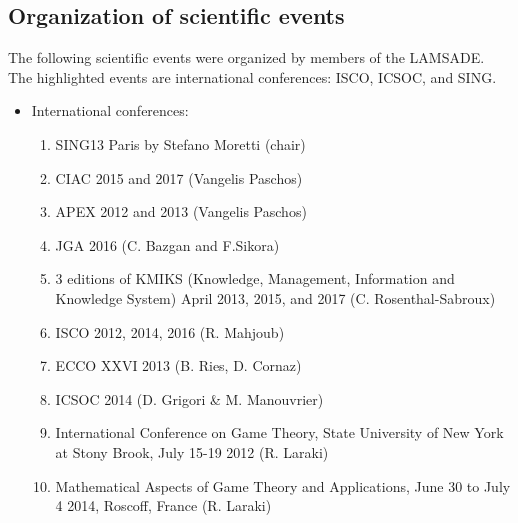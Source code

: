 \documentclass[version=last, pagesize, twoside=semi, DIV=calc, 12pt, a4paper, french, english, bibliography=totoc]{scrartcl}
\begin{document}
\subsection{Organization of scientific events}
The following scientific events were organized by members of the LAMSADE. 
The highlighted events are international conferences: ISCO, ICSOC, and SING.   
\begin{itemize} 
\item International conferences:
\begin{enumerate} 
\item SING13 Paris by Stefano Moretti (chair)%
\item CIAC 2015 and 2017 (Vangelis Paschos)
\item APEX 2012 and 2013 (Vangelis Paschos)
\item JGA 2016 (C. Bazgan and F.Sikora)
\item 3 editions of KMIKS (Knowledge, Management, Information and Knowledge System) April 2013,  2015, and 2017 (C. Rosenthal-Sabroux)
\item ISCO 2012, 2014, 2016 (R. Mahjoub)
\item ECCO XXVI 2013 (B. Ries, D. Cornaz)
\item ICSOC 2014 (D. Grigori \& M. Manouvrier)
\item International Conference on Game Theory, State University of New York at Stony Brook, July 15-19 2012 (R. Laraki)
\item Mathematical Aspects of Game Theory and Applications, June 30 to July 4 2014, Roscoff, France (R. Laraki)
\end{enumerate}


\end{itemize}
\end{document}
